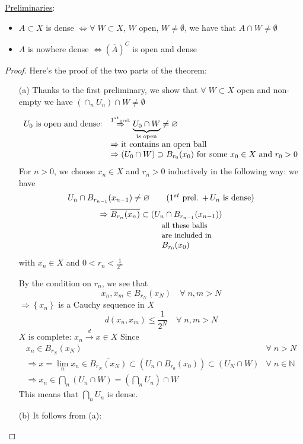 \noindent\underline{Preliminaries}:
\begin{itemize}
    \item \(A \subset X\) is dense \(\Leftrightarrow \forall \; W \subset X\), \(W\) open, \(W \neq \emptyset\), we have that \(A \cap W \neq \emptyset\)
    \item \(A\) is nowhere dense \(\Leftrightarrow \left(\bar{A}\right)^C\) is open and dense
\end{itemize}

\begin{proof} Here's the proof of the two parts of the theorem:
    \begin{itemize}
        \item[(a)] Thanks to the first preliminary, we show that \(\forall \; W \subset X\) open and non-empty we have \((\cap_n U_n) \cap W \neq \emptyset\)
        
        \[
            \begin{array}{rl}
                U_0 \text{ is open and dense:} & \overset{1^{st}\text{\tiny{prel.}}}{\Rightarrow} \underbrace{U_0 \cap W}_{\text{is open}} \neq \emptyset \\
                & \Rightarrow \text{it contains an open ball} \\
                & \Rightarrow (U_0 \cap W) \supset B_{r_0}(x_0) \mbox{ for some } x_0 \in X \mbox{ and } r_0 > 0
        \end{array}
        \] 
        For \(n>0\), we choose \(x_n \in X\) and \(r_n > 0\) inductively in the following way: we have 
        \[
            U_n \cap B_{r_{n-1}}(x_{n-1}) \neq \emptyset 
        \tag*{(\(1^{st}\) prel. \(+ \, U_n\) is dense)}\]
        \[
            \Rightarrow \overline{B_{r_n}(x_n)} \subset \underset{\begin{array}{l}\text{\small{all these balls}} \\ \text{\small{are included in}} \\
            \displaystyle{B_{r_0}(x_0)}\end{array}}{(U_n \cap B_{r_{n-1}}(x_{n-1}))}
        \]
        with \(x_n \in X\) and \(0 < r_n < \frac{1}{2^n}\)

        By the condition on \(r_n\), we see that 
        \[
            x_n, x_m \in B_{r_N}(x_N) \quad \forall \; n,m > N
        \]
        \(\Rightarrow \left\{ x_n \right\}\) is a Cauchy sequence in \(X\)
        \[
            d(x_n, x_m) \leq \frac{1}{2^N} \quad \forall \; n,m > N
        \]
        \(X\) is complete: \(x_n \overset{d}{\rightarrow} x \in X\)
        Since 
        \[
            \begin{array}{lr}
                x_n \in B_{r_N}(x_N) & \forall \; n > N \\
                \Rightarrow x = \lim_n x_n \in \overline{B_{r_N}(x_N)} \subset (U_n \cap B_{r_0}(x_0)) \subset (U_N \cap W) & \forall \; n \in \mathbb{N} \\
                \Rightarrow x_n \in \bigcap_n (U_n \cap W) = \left(\bigcap_n U_n\right) \cap W
            \end{array}
        \]
        This means that \(\bigcap_n U_n\) is dense.
        \item[(b)] It follows from (a):
        

\end{itemize}
\end{proof}
